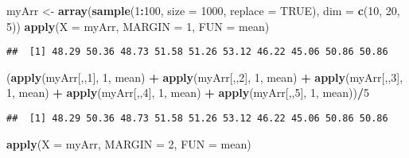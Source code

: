 \documentclass[]{book}
\newenvironment{Shaded}{\begin{snugshade}}{\end{snugshade}}
\newcommand{\KeywordTok}[1]{\textcolor[rgb]{0.13,0.29,0.53}{\textbf{#1}}}
\newcommand{\DataTypeTok}[1]{\textcolor[rgb]{0.13,0.29,0.53}{#1}}
\newcommand{\DecValTok}[1]{\textcolor[rgb]{0.00,0.00,0.81}{#1}}
\newcommand{\StringTok}[1]{\textcolor[rgb]{0.31,0.60,0.02}{#1}}
\newcommand{\OtherTok}[1]{\textcolor[rgb]{0.56,0.35,0.01}{#1}}
\newcommand{\OperatorTok}[1]{\textcolor[rgb]{0.81,0.36,0.00}{\textbf{#1}}}
\newcommand{\NormalTok}[1]{#1}
\theoremstyle{definition}
\theoremstyle{definition}
\theoremstyle{definition}
\theoremstyle{remark}
\begin{document}
\begin{Shaded}
\begin{Highlighting}[]
\NormalTok{myArr <-}\StringTok{ }\KeywordTok{array}\NormalTok{(}\KeywordTok{sample}\NormalTok{(}\DecValTok{1}\OperatorTok{:}\DecValTok{100}\NormalTok{, }\DataTypeTok{size =} \DecValTok{1000}\NormalTok{, }\DataTypeTok{replace =} \OtherTok{TRUE}\NormalTok{), }\DataTypeTok{dim =} \KeywordTok{c}\NormalTok{(}\DecValTok{10}\NormalTok{, }\DecValTok{20}\NormalTok{, }\DecValTok{5}\NormalTok{))}
\KeywordTok{apply}\NormalTok{(}\DataTypeTok{X =}\NormalTok{ myArr, }\DataTypeTok{MARGIN =} \DecValTok{1}\NormalTok{, }\DataTypeTok{FUN =}\NormalTok{ mean)}
\end{Highlighting}
\end{Shaded}

\begin{verbatim}
##  [1] 48.29 50.36 48.73 51.58 51.26 53.12 46.22 45.06 50.86 50.86
\end{verbatim}

\begin{Shaded}
\begin{Highlighting}[]
\NormalTok{(}\KeywordTok{apply}\NormalTok{(myArr[,,}\DecValTok{1}\NormalTok{], }\DecValTok{1}\NormalTok{, mean) }\OperatorTok{+}\StringTok{ }\KeywordTok{apply}\NormalTok{(myArr[,,}\DecValTok{2}\NormalTok{], }\DecValTok{1}\NormalTok{, mean) }\OperatorTok{+}\StringTok{ }
\StringTok{  }\KeywordTok{apply}\NormalTok{(myArr[,,}\DecValTok{3}\NormalTok{], }\DecValTok{1}\NormalTok{, mean) }\OperatorTok{+}\StringTok{ }\KeywordTok{apply}\NormalTok{(myArr[,,}\DecValTok{4}\NormalTok{], }\DecValTok{1}\NormalTok{, mean) }\OperatorTok{+}\StringTok{ }
\StringTok{  }\KeywordTok{apply}\NormalTok{(myArr[,,}\DecValTok{5}\NormalTok{], }\DecValTok{1}\NormalTok{, mean))}\OperatorTok{/}\DecValTok{5}
\end{Highlighting}
\end{Shaded}

\begin{verbatim}
##  [1] 48.29 50.36 48.73 51.58 51.26 53.12 46.22 45.06 50.86 50.86
\end{verbatim}

\begin{Shaded}
\begin{Highlighting}[]
\KeywordTok{apply}\NormalTok{(}\DataTypeTok{X =}\NormalTok{ myArr, }\DataTypeTok{MARGIN =} \DecValTok{2}\NormalTok{, }\DataTypeTok{FUN =}\NormalTok{ mean)}
\end{Highlighting}
\end{Shaded}
\end{document}
